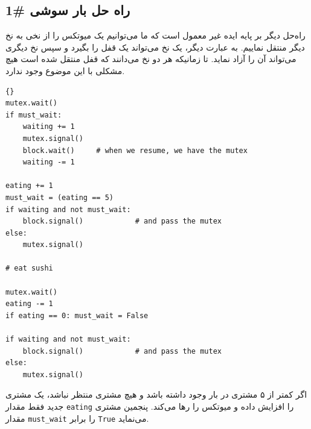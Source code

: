 \documentclass{book}
\newcommand{\clearemptydoublepage}{\newpage\cleardoublepage}
\begin{document}
\clearemptydoublepage
\subsection{راه حل بار سوشی  \#1}

     راه‌حل دیگر  بر پایه ایده غیر معمول است که ما می‌توانیم یک میوتکس را از نخی به نخ دیگر منتقل نماییم. 
     به عبارت دیگر، یک نخ می‌تواند یک قفل را بگیرد و سپس نخ دیگری می‌تواند آن را آزاد نماید. تا زمانیکه هر دو نخ می‌دانند که قفل منتقل شده است 
     هیچ مشکلی با این موضوع وجود ندارد. 

\begin{latin}
\begin{lstlisting}[title=\rl{راه حل بار سوشی  \#2}]{}
mutex.wait()
if must_wait:
    waiting += 1
    mutex.signal()
    block.wait()     # when we resume, we have the mutex
    waiting -= 1

eating += 1
must_wait = (eating == 5)
if waiting and not must_wait:
    block.signal()            # and pass the mutex
else:
    mutex.signal()

# eat sushi

mutex.wait()
eating -= 1
if eating == 0: must_wait = False

if waiting and not must_wait:
    block.signal()            # and pass the mutex
else:
    mutex.signal()
\end{lstlisting}
\end{latin}


    اگر کمتر از ۵ مشتری در بار وجود داشته باشد و هیچ مشتری منتظر نباشد، یک مشتری جدید فقط مقدار {\tt eating} را افزایش داده و میوتکس را رها می‌کند. 
    پنجمین مشتری مقدار {\tt must\_wait} را برابر \texttt{True} می‌نماید. 
\end{document}
